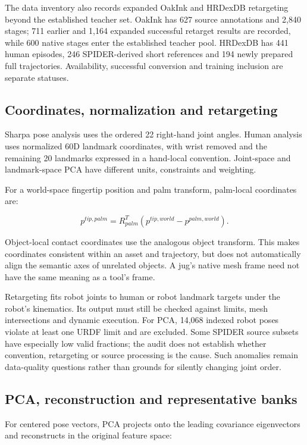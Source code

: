 \documentclass[10pt,twocolumn]{article}
\begin{document}
The data inventory also records expanded OakInk and HRDexDB retargeting beyond the established teacher set. OakInk has 627 source annotations and 2,840 stages; 711 earlier and 1,164 expanded successful retarget results are recorded, while 600 native stages enter the established teacher pool. HRDexDB has 441 human episodes, 246 SPIDER-derived short references and 194 newly prepared full trajectories. Availability, successful conversion and training inclusion are separate statuses.

\subsection{Coordinates, normalization and retargeting}

Sharpa pose analysis uses the ordered 22 right-hand joint angles. Human analysis uses normalized 60D landmark coordinates, with wrist removed and the remaining 20 landmarks expressed in a hand-local convention. Joint-space and landmark-space PCA have different units, constraints and weighting.

For a world-space fingertip position and palm transform, palm-local coordinates are:

\[
p^{tip,palm}=R_{palm}^{T}(p^{tip,world}-p^{palm,world}).
\]

Object-local contact coordinates use the analogous object transform. This makes coordinates consistent within an asset and trajectory, but does not automatically align the semantic axes of unrelated objects. A jug's native mesh frame need not have the same meaning as a tool's frame.

Retargeting fits robot joints to human or robot landmark targets under the robot's kinematics. Its output must still be checked against limits, mesh intersections and dynamic execution. For PCA, 14,068 indexed robot poses violate at least one URDF limit and are excluded. Some SPIDER source subsets have especially low valid fractions; the audit does not establish whether convention, retargeting or source processing is the cause. Such anomalies remain data-quality questions rather than grounds for silently changing joint order.

\subsection{PCA, reconstruction and representative banks}

For centered pose vectors, PCA projects onto the leading covariance eigenvectors and reconstructs in the original feature space:
\end{document}
